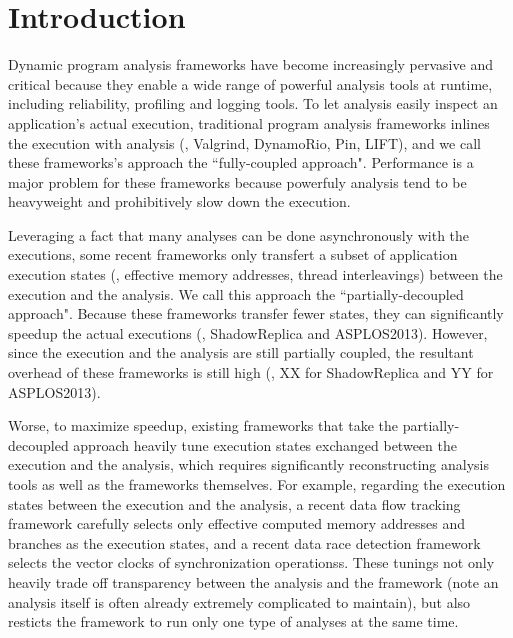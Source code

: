 \section{Introduction} \label{sec:intro}



Dynamic program analysis frameworks have become increasingly pervasive and 
critical because they enable a wide range of powerful analysis tools at 
runtime, including reliability, profiling and logging tools. To let analysis 
easily inspect an application's actual execution, traditional program analysis 
frameworks inlines the execution with analysis (\eg, Valgrind, DynamoRio, Pin, 
LIFT), and we call these frameworks's approach the ``fully-coupled 
approach". Performance is a major problem for these frameworks because 
powerfuly analysis tend to be heavyweight and prohibitively slow down the 
execution.


Leveraging a fact that many analyses can be done asynchronously with the 
executions, some recent frameworks only transfert a subset of application 
execution states (\eg, effective memory addresses, thread interleavings) 
between the execution and the analysis. We call this approach the 
``partially-decoupled approach". Because these frameworks transfer fewer 
states, they can significantly speedup the actual executions (\eg, 
ShadowReplica and ASPLOS2013). However, since the execution and the analysis 
are still partially coupled, the resultant overhead of these frameworks is 
still high (\eg, XX for ShadowReplica and YY for ASPLOS2013).


Worse, to maximize speedup, existing frameworks that take the 
partially-decoupled approach heavily tune execution states exchanged between 
the execution and the analysis, which requires significantly reconstructing 
analysis tools as well as the frameworks themselves. For example, regarding the 
execution states between the execution and the analysis, a recent data flow 
tracking framework carefully selects only effective computed memory addresses 
and branches as the execution states, and a recent data race detection 
framework selects the vector clocks of synchronization operationss. These 
tunings not only heavily trade off transparency between the 
analysis and the framework (note an analysis itself is often already extremely 
complicated to maintain), but also resticts the framework to run only one type 
of analyses at the same time.

